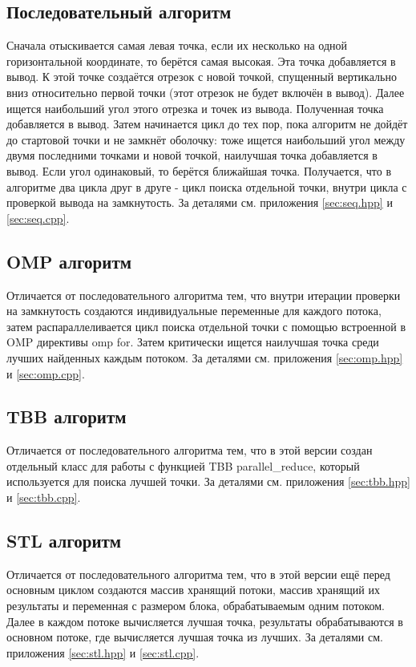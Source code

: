 \documentclass[12pt,a4paper]{extarticle}
\begin{document}
\subsection{Последовательный алгоритм}
Сначала отыскивается самая левая точка, если их несколько на одной горизонтальной координате, то берётся самая высокая. Эта точка добавляется в вывод. К этой точке создаётся отрезок с новой точкой, спущенный вертикально вниз относительно первой точки (этот отрезок не будет включён в вывод). Далее ищется наибольший угол этого отрезка и точек из вывода. Полученная точка добавляется в вывод. Затем начинается цикл до тех пор, пока алгоритм не дойдёт до стартовой точки и не замкнёт оболочку: тоже ищется наибольший угол между двумя последними точками и новой точкой, наилучшая точка добавляется в вывод. Если угол одинаковый, то берётся ближайшая точка.
Получается, что в алгоритме два цикла друг в друге - цикл поиска отдельной точки, внутри цикла с проверкой вывода на замкнутость. За деталями см. приложения \ref{sec:seq.hpp} и \ref{sec:seq.cpp}.

\subsection{OMP алгоритм}
Отличается от последовательного алгоритма тем, что внутри итерации проверки на замкнутость создаются индивидуальные переменные для каждого потока, затем распараллеливается цикл поиска отдельной точки с помощью встроенной в OMP директивы omp for. Затем критически ищется наилучшая точка среди лучших найденных каждым потоком. За деталями см. приложения \ref{sec:omp.hpp} и \ref{sec:omp.cpp}.

\subsection{TBB алгоритм}
Отличается от последовательного алгоритма тем, что в этой версии создан отдельный класс для работы с функцией TBB parallel\_reduce, который используется для поиска лучшей точки. За деталями см. приложения \ref{sec:tbb.hpp} и \ref{sec:tbb.cpp}.

\subsection{STL алгоритм}
Отличается от последовательного алгоритма тем, что в этой версии ещё перед основным циклом создаются массив хранящий потоки, массив хранящий их результаты и переменная с размером блока, обрабатываемым одним потоком.
Далее в каждом потоке вычисляется лучшая точка, результаты обрабатываются в основном потоке, где вычисляется лучшая точка из лучших.
За деталями см. приложения \ref{sec:stl.hpp} и \ref{sec:stl.cpp}.
\end{document}
